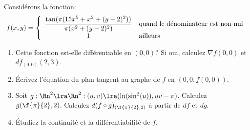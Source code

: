 
\begin{exercice}\label{exo0059}

Considérons la fonction:\[f(x,y)=\left\{\begin{array}{cl}
                        \dfrac{\tan(\pi(15x^5+x^2+(y-2)^2))}{\pi(x^2+(y-2)^2)} & {\rm quand \ le \ d\acute{e}nominateur \ est \ non \ nul}  \\
                        1             						    & {\rm ailleurs}
                        \end{array}\right.\]	
 
 \begin{enumerate}
 \item  Cette fonction est-elle différentiable en $(0,0)$? Si oui, calculez  $\nabla f(0,0)$ et $df_{(0,0)}(2,3)$. 
 
 \item Écrivez l'équation du plan tangent au graphe de $f$ en $(0,0,f(0,0))$.  
 \item Soit $g:\Rn^2\lra\Rn^2:(u,v)\lra(\ln(\sin^2(u)),uv-\pi)$. Calculez $g(\f{\pi}{2}, 2)$. Calculez $d(f\circ g)_{(\f{\pi}{2},2)}$ à partir de $df$ et $dg$. 
 
 \item Étudiez la continuité et la différentiabilité de $f$. 
\end{enumerate}

\end{exercice}
